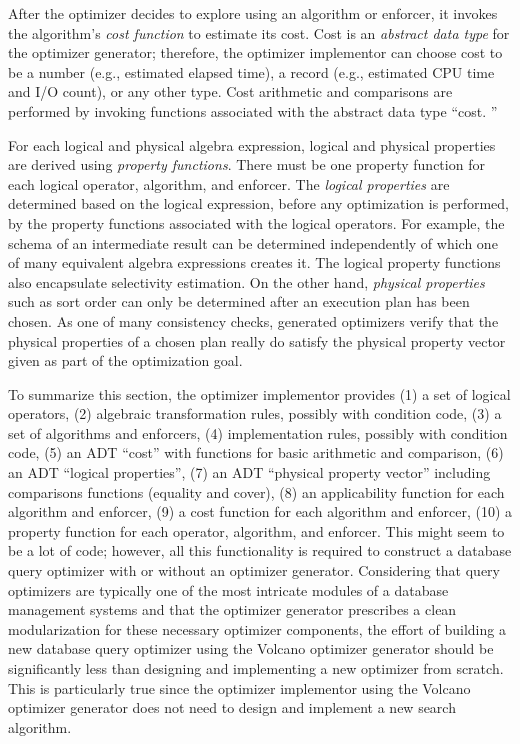 \documentclass[a4paper,12pt,notitlepage,twoside,openright]{article}
\begin{document}
After the optimizer decides to explore using an algorithm or enforcer,
it invokes the algorithm's \emph{cost function} to estimate its cost.
Cost is an \emph{abstract data type} for the optimizer generator;
therefore, the optimizer implementor can choose cost to be a number
(e.g., estimated elapsed time), a record (e.g., estimated CPU time and
I/O count), or any other type. Cost arithmetic and comparisons are
performed by invoking functions associated with the abstract data type
``cost. ''

For each logical and physical algebra expression, logical and physical
properties are derived using \emph{property functions}. There must be one
property function for each logical operator, algorithm, and enforcer.
The \emph{logical properties} are determined based on the logical expression,
before any optimization is performed, by the property functions
associated with the logical operators. For example, the schema of an
intermediate result can be determined independently of which one of many
equivalent algebra expressions creates it. The logical property
functions also encapsulate selectivity estimation. On the other hand,
\emph{physical properties} such as sort order can only be determined after an
execution plan has been chosen. As one of many consistency checks,
generated optimizers verify that the physical properties of a chosen
plan really do satisfy the physical property vector given as part of the
optimization goal.

To summarize this section, the optimizer implementor provides (1) a set
of logical operators, (2) algebraic transformation rules, possibly with
condition code, (3) a set of algorithms and enforcers, (4)
implementation rules, possibly with condition code, (5) an ADT ``cost''
with functions for basic arithmetic and comparison, (6) an ADT ``logical
properties'', (7) an ADT ``physical property vector'' including comparisons
functions (equality and cover), (8) an applicability function for each
algorithm and enforcer, (9) a cost function for each algorithm and
enforcer, (10) a property function for each operator, algorithm, and
enforcer. This might seem to be a lot of code; however, all this
functionality is required to construct a database query optimizer with
or without an optimizer generator. Considering that query optimizers are
typically one of the most intricate modules of a database management
systems and that the optimizer generator prescribes a clean
modularization for these necessary optimizer components, the effort of
building a new database query optimizer using the Volcano optimizer
generator should be significantly less than designing and implementing a
new optimizer from scratch. This is particularly true since the
optimizer implementor using the Volcano optimizer generator does not
need to design and implement a new search algorithm.
\end{document}
